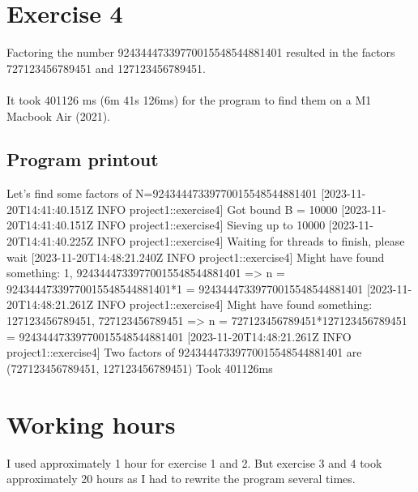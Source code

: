 \documentclass[12pt]{article}
\begin{document}
\section*{Exercise 4}
Factoring the number 92434447339770015548544881401 resulted in the factors \\
727123456789451 and 127123456789451.
\\\\
It took 401126 ms (6m 41s 126ms) for the program to find them on a M1 Macbook Air (2021).

\subsection*{Program printout}
\begin{verbnobox} Let's find some factors of N=92434447339770015548544881401
[2023-11-20T14:41:40.151Z INFO  project1::exercise4] Got bound B = 10000
[2023-11-20T14:41:40.151Z INFO  project1::exercise4] Sieving up to 10000
[2023-11-20T14:41:40.225Z INFO  project1::exercise4] Waiting for threads to finish, please wait
[2023-11-20T14:48:21.240Z INFO  project1::exercise4] Might have found something: 
    1, 92434447339770015548544881401 => n = 92434447339770015548544881401*1 = 92434447339770015548544881401
[2023-11-20T14:48:21.261Z INFO  project1::exercise4] Might have found something: 
    127123456789451, 727123456789451 => n = 727123456789451*127123456789451 = 92434447339770015548544881401
[2023-11-20T14:48:21.261Z INFO  project1::exercise4] Two factors of 92434447339770015548544881401 are 
    (727123456789451, 127123456789451)
Took 401126ms
\end{verbnobox}


\section*{Working hours}
I used approximately 1 hour for exercise 1 and 2. But exercise 3 and 4 took approximately 20 hours as I had to rewrite the program several times.


\newpage


\end{document}
